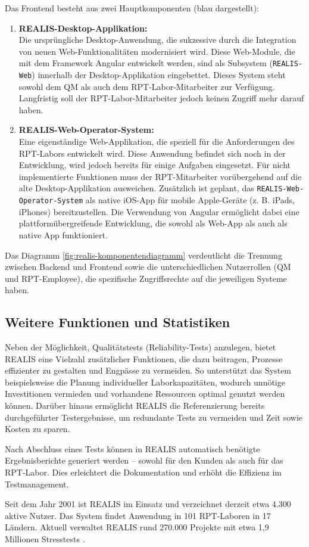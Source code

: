 Das Frontend besteht aus zwei Hauptkomponenten (blau dargestellt):
\begin{enumerate}
    \item \textbf{REALIS-Desktop-Applikation:} \\
Die ursprüngliche Desktop-Anwendung, die sukzessive durch die Integration von neuen Web-Funktionalitäten modernisiert wird. Diese Web-Module, die mit dem Framework Angular entwickelt werden, sind als Subsystem (\texttt{REALIS-Web}) innerhalb der Desktop-Applikation eingebettet. Dieses System steht sowohl dem \gls{QM} als auch dem \gls{RPT}-Labor-Mitarbeiter zur Verfügung. Langfristig soll der \gls{RPT}-Labor-Mitarbeiter jedoch keinen Zugriff mehr darauf haben.

\item \textbf{REALIS-Web-Operator-System:} \\
Eine eigenständige Web-Applikation, die speziell für die Anforderungen des \gls{RPT}-Labors entwickelt wird. Diese Anwendung befindet sich noch in der Entwicklung, wird jedoch bereits für einige Aufgaben eingesetzt. Für nicht implementierte Funktionen muss der \gls{RPT}-Mitarbeiter vorübergehend auf die alte Desktop-Applikation ausweichen. Zusätzlich ist geplant, das \texttt{REALIS-Web-Operator-System} als native iOS-App für mobile Apple-Geräte (z. B. iPads, iPhones) bereitzustellen. Die Verwendung von Angular ermöglicht dabei eine plattformübergreifende Entwicklung, die sowohl als Web-App als auch als native App funktioniert.
\end{enumerate}

Das Diagramm \ref{fig:realis-komponentendiagramm} verdeutlicht die Trennung zwischen Backend und Frontend sowie die unterschiedlichen Nutzerrollen (\gls{QM} und \gls{RPT}-Employee), die spezifische Zugriffsrechte auf die jeweiligen Systeme haben.


\subsection{Weitere Funktionen und Statistiken}
Neben der Möglichkeit, Qualitätstests (Reliability-Tests) anzulegen, bietet \gls{REALIS} eine Vielzahl zusätzlicher Funktionen, die dazu beitragen, Prozesse effizienter zu gestalten und Engpässe zu vermeiden. So unterstützt das System beispielsweise die Planung individueller Laborkapazitäten, wodurch unnötige Investitionen vermieden und vorhandene Ressourcen optimal genutzt werden können. Darüber hinaus ermöglicht \gls{REALIS} die Referenzierung bereits durchgeführter Testergebnisse, um redundante Tests zu vermeiden und Zeit sowie Kosten zu sparen.

Nach Abschluss eines Tests können in \gls{REALIS} automatisch benötigte Ergebnisberichte generiert werden – sowohl für den Kunden als auch für das \gls{RPT}-Labor. Dies erleichtert die Dokumentation und erhöht die Effizienz im Testmanagement.

Seit dem Jahr 2001 ist \gls{REALIS} im Einsatz und verzeichnet derzeit etwa 4.300 aktive Nutzer. Das System findet Anwendung in 101 \gls{RPT}-Laboren in 17 Ländern. Aktuell verwaltet \gls{REALIS} rund 270.000 Projekte mit etwa 1,9 Millionen Stresstests \cite{REALISPowerPointIntern}.